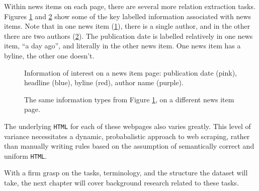 Within news items on each page, there are several more relation
extraction tasks.  Figures \ref{item1} and \ref{item2} show some of
the key labelled information associated with news items.  Note that
in one news item (\ref{item1}), there is a single author, and in the
other there are two authors (\ref{item2}).  The publication date is
labelled relatively in one news item, ``a day ago'', and literally
in the other news item.  One news item has a byline, the other one
doesn't.
\begin{figure}[H]
    \centering
    \caption{Information of interest on a news item page:
    publication date (pink), headline (blue), byline (red),
    author name (purple).\label{item1}
    }
\end{figure}
\begin{figure}[H]
    \centering
    \caption{The same information types from Figure \ref{item1},
    on a different news item page.\label{item2}}
\end{figure}
\noindent The underlying {\tt HTML} for each of these webpages
also varies greatly.  This level of variance necessitates
a dynamic, probabalistic approach to web scraping, rather than
manually writing rules based on the assumption of semantically
correct and uniform {\tt HTML}.

With a firm grasp on the tasks, terminology, and the structure the
dataset will take, the next chapter will cover background research
related to these tasks.